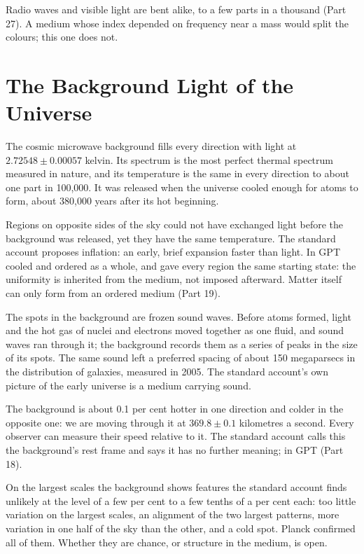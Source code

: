 \documentclass[11pt,a4paper]{article}
\begin{document}
 Radio waves and visible light are bent alike, to a few parts in a thousand (Part 27). A medium whose index depended on frequency near a mass would split the colours; this one does not.

\section{The Background Light of the Universe}

The cosmic microwave background fills every direction with light at $2.72548\pm0.00057$ kelvin. Its spectrum is the most perfect thermal spectrum measured in nature, and its temperature is the same in every direction to about one part in 100,000. It was released when the universe cooled enough for atoms to form, about 380,000 years after its hot beginning.

 Regions on opposite sides of the sky could not have exchanged light before the background was released, yet they have the same temperature. The standard account proposes inflation: an early, brief expansion faster than light. In GPT  cooled and ordered as a whole, and gave every region the same starting state: the uniformity is inherited from the medium, not imposed afterward. Matter itself can only form from an ordered medium (Part 19).

 The spots in the background are frozen sound waves. Before atoms formed, light and the hot gas of nuclei and electrons moved together as one fluid, and sound waves ran through it; the background records them as a series of peaks in the size of its spots. The same sound left a preferred spacing of about 150 megaparsecs in the distribution of galaxies, measured in 2005. The standard account's own picture of the early universe is a medium carrying sound.

 The background is about 0.1 per cent hotter in one direction and colder in the opposite one: we are moving through it at $369.8\pm0.1$ kilometres a second. Every observer can measure their speed relative to it. The standard account calls this the background's rest frame and says it has no further meaning; in GPT  (Part 18).

 On the largest scales the background shows features the standard account finds unlikely at the level of a few per cent to a few tenths of a per cent each: too little variation on the largest scales, an alignment of the two largest patterns, more variation in one half of the sky than the other, and a cold spot. Planck confirmed all of them. Whether they are chance, or structure in the medium, is open.
\end{document}
